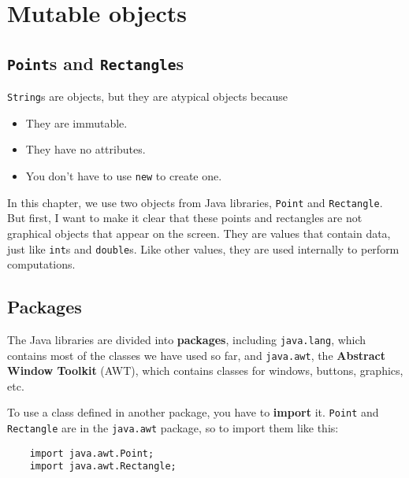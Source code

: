 \documentclass[12pt]{book}
\theoremstyle{definition}
\begin{document}
\chapter{Mutable objects}
\label{chap08}
\label{objects}


\section{{\tt Point}s and {\tt Rectangle}s}

{\tt String}s are objects, but they are atypical objects
because

\begin{itemize}

\item They are immutable.

\item They have no attributes.

\item You don't have to use {\tt new} to create one.

\end{itemize}

In this chapter, we use two objects from Java libraries,
 {\tt Point} and {\tt Rectangle}.
But first, I want to make it clear that these points
and rectangles are not graphical objects that appear on the
screen.  They are values that contain data, just like {\tt int}s
and {\tt double}s.  Like other values, they are used internally
to perform computations.


\section{Packages}

The Java libraries are divided into {\bf
packages}, including {\tt java.lang}, which contains most of the
classes we have used so far, and {\tt java.awt}, 
the {\bf Abstract Window Toolkit} (AWT),
which contains classes for windows, buttons, graphics, etc.

To use a class defined in another package, you have to {\bf
  import} it.  {\tt Point} and {\tt Rectangle} are in the
{\tt java.awt} package, so to import them like this:

\begin{lstlisting}
    import java.awt.Point;
    import java.awt.Rectangle;
\end{lstlisting}
\end{document}
